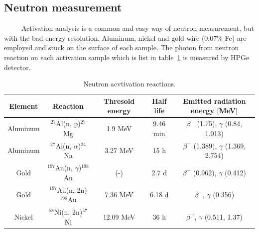   \subsection{Neutron measurement}
~~~~~Activation analysis is a common and easy way of neutron measurement, but with the bad energy resolution.
Aluminum, nickel and gold wire (0.07\% Fe) are employed and stuck on the surface of each sample.
The photon from neutron reaction on each activation sample which is list in table~\ref{act} is measured by HPGe detector.
\begin{table}[H]
 \centering
 \begin{tabular}{ccccc} \hline \hline
  Element & Reaction & Thresold energy & Half life & Emitted radiation energy [MeV] \\ \hline
  Aluminum & $^{27}$Al(n, p)$^{27}$Mg & 1.9 MeV & 9.46 min & $\beta^-$ (1.75), $\gamma$ (0.84, 1.013) \\
  Aluminum & $^{27}$Al(n, $\alpha$)$^{24}$Na & 3.27 MeV & 15 h & $\beta^-$ (1.389), $\gamma$ (1.369, 2.754) \\
  Gold & $^{197}$Au(n, $\gamma$)$^{198}$Au & (-) & 2.7 d & $\beta^-$ (0.962), $\gamma$ (0.412) \\
  Gold & $^{197}$Au(n, 2n)$^{196}$Au & 7.36 MeV & 6.18 d & $\beta^-$, $\gamma$ (0.356) \\
  Nickel & $^{58}$Ni(n, 2n)$^{57}$Ni & 12.09 MeV & 36 h & $\beta^+$, $\gamma$ (0.511, 1.37) \\ \hline \hline
 \end{tabular}
 \caption{Neutron acvtivation reactions.}
 \label{act}
\end{table}
